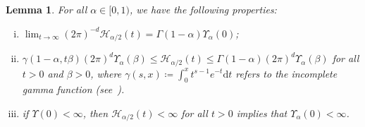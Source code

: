 \documentclass[a4paper,11pt]{article}%
\theoremstyle{plain}
\newtheorem{lemma}[theorem]{Lemma}
\theoremstyle{definition}
\numberwithin{equation}{section}
\newcommand{\ud}{\ensuremath{\mathrm{d}}}
\begin{document}
\begin{lemma}\label{L:HUA}
  For all $\alpha\in [0,1)$, we have the following properties:
  \begin{enumerate}[(i)]
    \item $\displaystyle \lim_{t\to\infty}\left(2\pi\right)^{-d}\mathcal{H}_{\alpha/2}(t) =
      \Gamma\left(1-\alpha\right) \Upsilon_{\alpha}(0)$;
    \item $\gamma\left(1-\alpha,t\beta\right) \left(2\pi\right)^d \Upsilon_\alpha(\beta) \le
      \mathcal{H}_{\alpha/2}(t) \le \Gamma\left(1-\alpha\right) \left(2\pi\right)^d
      \Upsilon_\alpha(\beta)$ for all $t>0$ and $\beta>0$, where $\gamma(s,x)\coloneqq \int_0^x
      t^{s-1} e^{-t}\ud t$ refers to the incomplete gamma function
      (see~\cite{olver.lozier.ea:10:nist}).
    \item if $\Upsilon(0)<\infty$, then $\mathcal{H}_{\alpha/2}(t)<\infty$ for all $t>0$ implies
      that $\Upsilon_\alpha(0)<\infty$.
  \end{enumerate}
\end{lemma}
\end{document}
